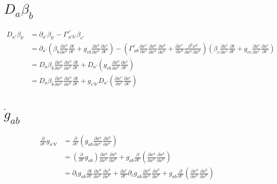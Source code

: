 \documentclass{article}
\begin{document}
\section{$D_{a}\beta_{b}$}
\begin{align*}
D_{a'}\beta_{b'} & = \partial_{a'}\beta_{b'} - \Gamma^{c'}_{~a'b'}\beta_{c'}\\
& = \partial_{a'}(\beta_{b}\frac{\partial x^{b}}{\partial x^{b'}}\frac{\partial t}{\partial t'} + g_{cb}\frac{\partial x^{b}}{\partial x^{b'}}\frac{\partial x^{c}}{\partial t'}) - (\Gamma^{c}_{~ab}\frac{\partial x^{c'}}{\partial x^{c}}\frac{\partial x^{a}}{\partial x^{a'}}\frac{\partial x^{b}}{\partial x^{b'}} + \frac{\partial x^{c'}}{\partial x^{d}}\frac{\partial^2 x^{d}}{\partial x^{a'}\partial x^{b'}})(\beta_{c}\frac{\partial x^{c}}{\partial x^{c'}}\frac{\partial t}{\partial t'} + g_{ce}\frac{\partial x^{c}}{\partial x^{c'}}\frac{\partial x^{e}}{\partial t'})\\
& = D_{a}\beta_{b}\frac{\partial x^{a}}{\partial x^{a'}}\frac{\partial x^{b}}{\partial x^{b'}}\frac{\partial t}{\partial t'} + D_{a'}(g_{cb}\frac{\partial x^{b}}{\partial x^{b'}}\frac{\partial x^{c}}{\partial t'})\\
& = D_{a}\beta_{b}\frac{\partial x^{a}}{\partial x^{a'}}\frac{\partial x^{b}}{\partial x^{b'}}\frac{\partial t}{\partial t'} + g_{c'b'}D_{a'}(\frac{\partial x^{c'}}{\partial x^{c}}\frac{\partial x^{c}}{\partial t'})
\end{align*}
\section{${\dot g_{ab}}$}
\begin{align*}
\frac{\partial}{\partial t'}g_{a'b'} & = \frac{\partial}{\partial {t'}}(g_{ab}\frac{\partial x^{a}}{\partial x^{a'}}\frac{\partial x^{b}}{\partial x^{b'}})\\
& = (\frac{\partial}{\partial t'}g_{ab})\frac{\partial x^{a}}{\partial x^{a'}}\frac{\partial x^{b}}{\partial x^{b'}} + g_{ab}\frac{\partial}{\partial t'}(\frac{\partial x^{a}}{\partial x^{a'}}\frac{\partial x^{b}}{\partial x^{b'}})\\
& =\partial_{t}g_{ab} \frac{\partial t}{\partial t'}\frac{\partial x^{a}}{\partial x^{a'}}\frac{\partial x^{b}}{\partial x^{b'}} + \frac{\partial x^{c}}{\partial t'}\partial_{c}g_{ab}\frac{\partial x^{a}}{\partial x^{a'}}\frac{\partial x^{b}}{\partial x^{b'}} + g_{ab}\frac{\partial}{\partial t'}(\frac{\partial x^{a}}{\partial x^{a'}}\frac{\partial x^{b}}{\partial x^{b'}})
\end{align*}
\end{document}
